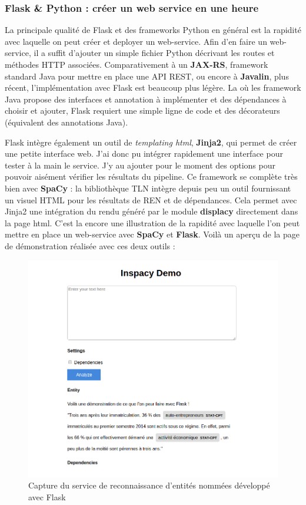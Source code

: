 \subsubsection*{Flask \& Python : créer un web service en une heure}
La principale qualité de Flask et des frameworks Python en général est la rapidité avec laquelle on peut créer et deployer un web-service. Afin d'en faire un web-service, il a suffit d'ajouter un simple fichier Python décrivant les routes et méthodes HTTP associées. Comparativement à un \textbf{JAX-RS}, framework standard Java pour mettre en place une API REST, ou encore à \textbf{Javalin}, plus récent, l'implémentation avec Flask est beaucoup plus légère. La où les framework Java propose des interfaces et annotation à implémenter et des dépendances à choisir et ajouter, Flask requiert une simple ligne de code et des décorateurs (équivalent des annotations Java).
\newline

Flask intègre également un outil de \textit{templating html}, \textbf{Jinja2}, qui permet de créer une petite interface web. J'ai donc pu intégrer rapidement une interface pour tester à la main le service. J'y au ajouter pour le moment des options pour pouvoir aisément vérifier les résultats du pipeline. Ce framework se complète très bien avec \textbf{SpaCy} : la bibliothèque TLN intègre depuis peu un outil fournissant un visuel HTML pour les résultats de REN et de dépendances. Cela permet avec Jinja2 une intégration du rendu généré par le module \textbf{displacy} directement dans la page html. C'est la encore une illustration de la rapidité avec laquelle l'on peut mettre en place un web-service avec \textbf{SpaCy} et \textbf{Flask}. Voilà un aperçu de la page de démonstration réalisée avec ces deux outils :
\begin{figure}[H]
    \centering
    \includegraphics[scale=0.6]{images/inspaCy-demo.png}
    \caption{Capture du service de reconnaissance d'entités nommées développé avec Flask}
    \label{fig:demo-inspaCy}
\end{figure}

